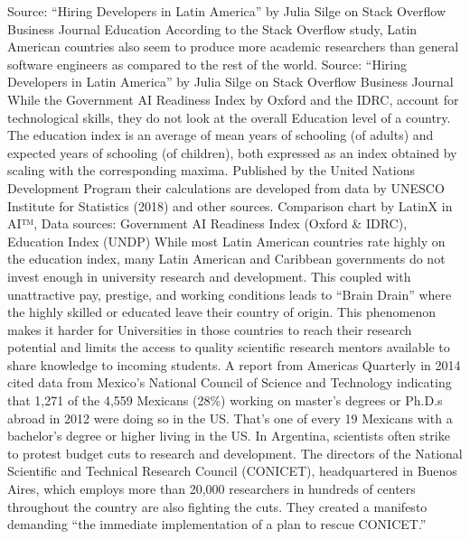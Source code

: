 \documentclass[conference]{IEEEtran}
\begin{document}
Source: ``Hiring Developers in Latin America'' by Julia Silge on Stack Overflow Business Journal
Education
According to the Stack Overflow study, Latin American countries also seem to produce more academic researchers than general software engineers as compared to the rest of the world.
Source: ``Hiring Developers in Latin America'' by Julia Silge on Stack Overflow Business Journal
While the Government AI Readiness Index by Oxford and the IDRC, account for technological skills, they do not look at the overall Education level of a country. The education index is an average of mean years of schooling (of adults) and expected years of schooling (of children), both expressed as an index obtained by scaling with the corresponding maxima. Published by the United Nations Development Program their calculations are developed from data by UNESCO Institute for Statistics (2018) and other sources.
Comparison chart by LatinX in AI™, Data sources: Government AI Readiness Index (Oxford \& IDRC), Education Index (UNDP)
While most Latin American countries rate highly on the education index, many Latin American and Caribbean governments do not invest enough in university research and development. This coupled with unattractive pay, prestige, and working conditions leads to ``Brain Drain'' where the highly skilled or educated leave their country of origin. This phenomenon makes it harder for Universities in those countries to reach their research potential and limits the access to quality scientific research mentors available to share knowledge to incoming students.
A report from Americas Quarterly in 2014 cited data from Mexico's National Council of Science and Technology indicating that 1,271 of the 4,559 Mexicans (28\%) working on master's degrees or Ph.D.s abroad in 2012 were doing so in the US. That's one of every 19 Mexicans with a bachelor's degree or higher living in the US.
In Argentina, scientists often strike to protest budget cuts to research and development. The directors of the National Scientific and Technical Research Council (CONICET), headquartered in Buenos Aires, which employs more than 20,000 researchers in hundreds of centers throughout the country are also fighting the cuts. They created a manifesto demanding ``the immediate implementation of a plan to rescue CONICET.''
\end{document}
